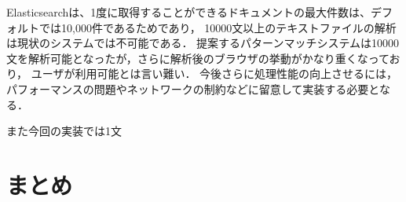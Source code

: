\documentclass{FITpaper}
\begin{document}
  Elasticsearchは、1度に取得することができるドキュメントの最大件数は、デフォルトでは10,000件であるためであり，
  10000文以上のテキストファイルの解析は現状のシステムでは不可能である．
  提案するパターンマッチシステムは10000文を解析可能となったが，さらに解析後のブラウザの挙動がかなり重くなっており，
  ユーザが利用可能とは言い難い．
  今後さらに処理性能の向上させるには，パフォーマンスの問題やネットワークの制約などに留意して実装する必要となる．

  また今回の実装では1文


\section{まとめ}


%

%
\end{document}

